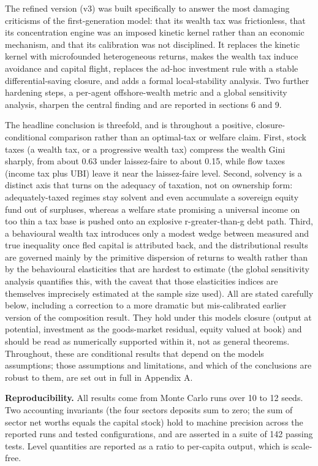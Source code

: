 \documentclass[11pt]{article}
\begin{document}
The refined version (v3) was built specifically to answer the most
damaging criticisms of the first-generation model: that its wealth tax
was frictionless, that its concentration engine was an imposed kinetic
kernel rather than an economic mechanism, and that its calibration was
not disciplined. It replaces the kinetic kernel with microfounded
heterogeneous returns, makes the wealth tax induce avoidance and capital
flight, replaces the ad-hoc investment rule with a stable
differential-saving closure, and adds a formal local-stability analysis.
Two further hardening steps, a per-agent offshore-wealth metric and a
global sensitivity analysis, sharpen the central finding and are
reported in sections 6 and 9.

The headline conclusion is threefold, and is throughout a positive,
closure-conditional comparison rather than an optimal-tax or welfare
claim. First, stock taxes (a wealth tax, or a progressive wealth tax)
compress the wealth Gini sharply, from about 0.63 under laissez-faire to
about 0.15, while flow taxes (income tax plus UBI) leave it near the
laissez-faire level. Second, solvency is a distinct axis that turns on
the adequacy of taxation, not on ownership form: adequately-taxed
regimes stay solvent and even accumulate a sovereign equity fund out of
surpluses, whereas a welfare state promising a universal income on too
thin a tax base is pushed onto an explosive r-greater-than-g debt path.
Third, a behavioural wealth tax introduces only a modest wedge between
measured and true inequality once fled capital is attributed back, and
the distributional results are governed mainly by the primitive
dispersion of returns to wealth rather than by the behavioural
elasticities that are hardest to estimate (the global sensitivity
analysis quantifies this, with the caveat that those
elasticities\textquotesingle{} indices are themselves imprecisely
estimated at the sample size used). All are stated carefully below,
including a correction to a more dramatic but mis-calibrated earlier
version of the composition result. They hold under this
model\textquotesingle s closure (output at potential, investment as the
goods-market residual, equity valued at book) and should be read as
numerically supported within it, not as general theorems. Throughout,
these are conditional results that depend on the model\textquotesingle s
assumptions; those assumptions and limitations, and which of the
conclusions are robust to them, are set out in full in Appendix A.

\textbf{Reproducibility.} All results come from Monte Carlo runs over 10
to 12 seeds. Two accounting invariants (the four
sectors\textquotesingle{} deposits sum to zero; the sum of sector net
worths equals the capital stock) hold to machine precision across the
reported runs and tested configurations, and are asserted in a suite of
142 passing tests. Level quantities are reported as a ratio to
per-capita output, which is scale-free.
\end{document}
